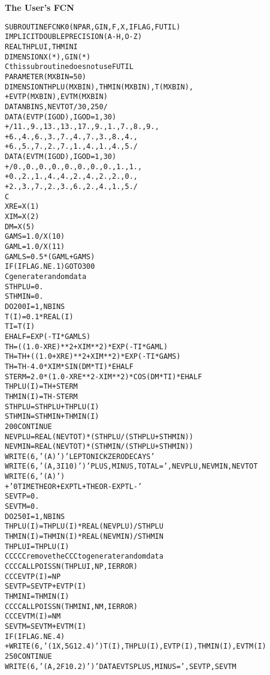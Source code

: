 \begin{center}\small\textbf{The User's FCN}\end{center}
\begin{alltt}\footnotesize
      SUBROUTINE FCNK0(NPAR,GIN,F,X,IFLAG,FUTIL)
      IMPLICIT DOUBLE PRECISION (A-H,O-Z)
      REAL THPLUI, THMINI
      DIMENSION X(*),GIN(*)
C   this subroutine does not use FUTIL
      PARAMETER (MXBIN=50)
      DIMENSION THPLU(MXBIN),THMIN(MXBIN),T(MXBIN),
     +    EVTP(MXBIN),EVTM(MXBIN)
      DATA  NBINS,NEVTOT/ 30,250/
      DATA (EVTP(IGOD),IGOD=1,30)
     +         /11.,  9., 13., 13., 17.,  9.,  1.,  7.,  8.,  9.,
     +           6.,  4.,  6.,  3.,  7.,  4.,  7.,  3.,  8.,  4.,
     +           6.,  5.,  7.,  2.,  7.,  1.,  4.,  1.,  4.,  5./
      DATA (EVTM(IGOD),IGOD=1,30)
     +         / 0.,  0.,  0.,  0.,  0.,  0.,  0.,  0.,  1.,  1.,
     +           0.,  2.,  1.,  4.,  4.,  2.,  4.,  2.,  2.,  0.,
     +           2.,  3.,  7.,  2.,  3.,  6.,  2.,  4.,  1.,  5./
C
      XRE = X(1)
      XIM = X(2)
      DM = X(5)
      GAMS = 1.0/X(10)
      GAML = 1.0/X(11)
      GAMLS = 0.5*(GAML+GAMS)
      IF (IFLAG .NE. 1)  GO TO 300
C                        generate random data
      STHPLU = 0.
      STHMIN = 0.
      DO 200 I= 1, NBINS
      T(I) = 0.1*REAL(I)
      TI = T(I)
      EHALF = EXP(-TI*GAMLS)
      TH =      ((1.0-XRE)**2 + XIM**2) * EXP(-TI*GAML)
      TH = TH + ((1.0+XRE)**2 + XIM**2) * EXP(-TI*GAMS)
      TH = TH -               4.0*XIM*SIN(DM*TI) * EHALF
      STERM = 2.0*(1.0-XRE**2-XIM**2)*COS(DM*TI) * EHALF
      THPLU(I) = TH + STERM
      THMIN(I) = TH - STERM
      STHPLU = STHPLU + THPLU(I)
      STHMIN = STHMIN + THMIN(I)
  200 CONTINUE
      NEVPLU = REAL(NEVTOT)*(STHPLU/(STHPLU+STHMIN))
      NEVMIN = REAL(NEVTOT)*(STHMIN/(STHPLU+STHMIN))
      WRITE (6,'(A)') '  LEPTONIC K ZERO DECAYS'
      WRITE (6,'(A,3I10)') ' PLUS, MINUS, TOTAL=',NEVPLU,NEVMIN,NEVTOT
      WRITE (6,'(A)')
     +  '0    TIME        THEOR+      EXPTL+     THEOR-      EXPTL-'
      SEVTP = 0.
      SEVTM = 0.
      DO 250 I= 1, NBINS
      THPLU(I) = THPLU(I)*REAL(NEVPLU) / STHPLU
      THMIN(I) = THMIN(I)*REAL(NEVMIN) / STHMIN
      THPLUI = THPLU(I)
CCCCC       remove the CCC to generate random data
CCC      CALL POISSN(THPLUI,NP,IERROR)
CCC      EVTP(I) = NP
      SEVTP = SEVTP + EVTP(I)
      THMINI = THMIN(I)
CCC      CALL POISSN(THMINI,NM,IERROR)
CCC      EVTM(I) = NM
      SEVTM = SEVTM + EVTM(I)
      IF (IFLAG .NE. 4)
     + WRITE (6,'(1X,5G12.4)') T(I),THPLU(I),EVTP(I),THMIN(I),EVTM(I)
  250 CONTINUE
      WRITE (6, '(A,2F10.2)') ' DATA EVTS PLUS, MINUS=', SEVTP,SEVTM

\end{alltt}
